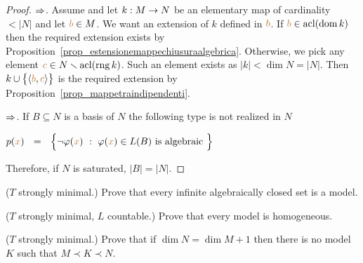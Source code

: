\begin{proof}
  $\Rightarrow$.
  Assume  and let $k:M\rightarrow N$ be an elementary map of cardinality $<|N|$ and let ${\color{brown} b}\in M$.
  We want an extension of $k$ defined in ${\color{brown} b}$.
  If ${\color{brown} b}\in\mathop{\rm acl}(\mathop{\rm dom} k)$ then the required extension exists by Proposition~\ref{prop_estensionemappechiusuraalgebrica}.
  Otherwise, we pick any element ${\color{brown} c}\in N\smallsetminus\mathop{\rm acl}(\mathop{\rm rng} k)$.
  Such an element exists as $|k|<\dim N=|N|$.
  Then $k\cup\big\{\langle{\color{brown}b},{\color{brown} c}\rangle\big\}$ is the required extension by Proposition~\ref{prop_mappetraindipendenti}.

  $\Rightarrow$.
  If $B\subseteq N$ is a basis of $N$ the following type is not realized in $N$

  \hfil $p({\color{brown} x})\ \ =\ \ \Big\{\neg\varphi({\color{brown} x})\ :\ \varphi({\color{brown} x})\in L(B)\textrm{ is algebraic }\Big\}$

  Therefore, if $N$ is saturated, $|B|=|N|$.
\end{proof}

\begin{exercise}\label{ex_infinite_acl}
  ($T$ strongly minimal.) Prove that every infinite algebraically closed set is a model.\QED
\end{exercise}

\begin{exercise}
  ($T$ strongly minimal, $L$ countable.) Prove that every model is homogeneous.\QED 
\end{exercise}

\begin{exercise}
  ($T$ strongly minimal.) Prove that if $\dim N=\dim M+1$ then there is no model $K$ such that $M\prec K\prec N$.\QED 
\end{exercise}




% 

